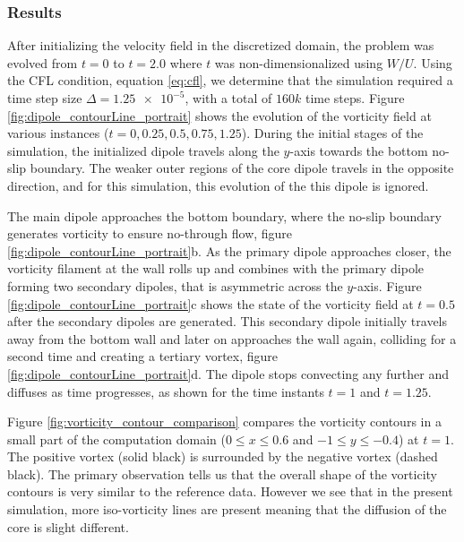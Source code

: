\subsubsection*{Results}
After initializing the velocity field in the discretized domain, the problem was evolved from $t=0$ to $t=2.0$ where $t$ was non-dimensionalized using $W/U$. Using the CFL condition, equation \ref{eq:cfl}, we determine that the simulation required a time step size $\Delta = \num{1.25e-5}$, with a total of $160k$ time steps. Figure \ref{fig:dipole_contourLine_portrait} shows the evolution of the vorticity field at various instances ($t = 0, 0.25, 0.5, 0.75, 1.25$). During the initial stages of the simulation, the initialized dipole travels along the $y$-axis towards the bottom no-slip boundary. The weaker outer regions of the core dipole travels in the opposite direction, and for this simulation, this evolution of the this dipole is ignored. 

The main dipole approaches the bottom boundary, where the no-slip boundary generates vorticity to ensure no-through flow, figure \ref{fig:dipole_contourLine_portrait}b. As the primary dipole approaches closer, the vorticity filament at the wall rolls up and combines with the primary dipole forming two secondary dipoles, that is asymmetric across the $y$-axis. Figure \ref{fig:dipole_contourLine_portrait}c shows the state of the vorticity field at $t=0.5$ after the secondary dipoles are generated. This secondary dipole initially travels away from the bottom wall and later on approaches the wall again, colliding for a second time and creating a tertiary vortex, figure \ref{fig:dipole_contourLine_portrait}d. The dipole stops convecting any further and diffuses as time progresses, as shown for the time instants $t = 1$ and $t = 1.25$.

Figure \ref{fig:vorticity_contour_comparison} compares the vorticity contours in a small part of the computation domain ($0\leqslant x \leqslant 0.6$ and $-1 \leqslant y \leqslant -0.4$) at $t = 1$. The positive vortex (solid black) is surrounded by the negative vortex (dashed black). The primary observation tells us that the overall shape of the vorticity contours is very similar to the reference data. However we see that in the present simulation, more iso-vorticity lines are present meaning that the diffusion of the core is slight different.

